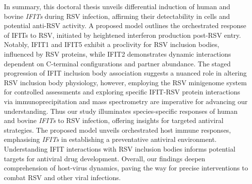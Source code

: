 In summary, this doctoral thesis unveils differential induction of human and bovine \textit{IFITs} during RSV infection, affirming their detectability in cells and potential anti-RSV activity. A proposed model outlines the orchestrated response of IFITs to RSV, initiated by heightened interferon production post-RSV entry. Notably, IFIT1 and IFIT5 exhibit a proclivity for RSV inclusion bodies, influenced by RSV proteins, while IFIT2 demonstrates dynamic interactions dependent on C-terminal configurations and partner abundance. The staged progression of IFIT inclusion body association suggests a nuanced role in altering RSV inclusion body physiology, however, employing the RSV minigenome system for controlled assessments and exploring specific IFIT-RSV protein interactions via immunoprecipitation and mass spectrometry are imperative for advancing our understanding. Thus our study illuminates species-specific responses of human and bovine \textit{IFITs} to RSV infection, offering insights for targeted antiviral strategies. The proposed model unveils orchestrated host immune responses, emphasising \textit{IFITs} in establishing a preventative antiviral environment. Understanding IFIT interactions with RSV inclusion bodies informs potential targets for antiviral drug development. Overall, our findings deepen comprehension of host-virus dynamics, paving the way for precise interventions to combat RSV and other viral infections.

